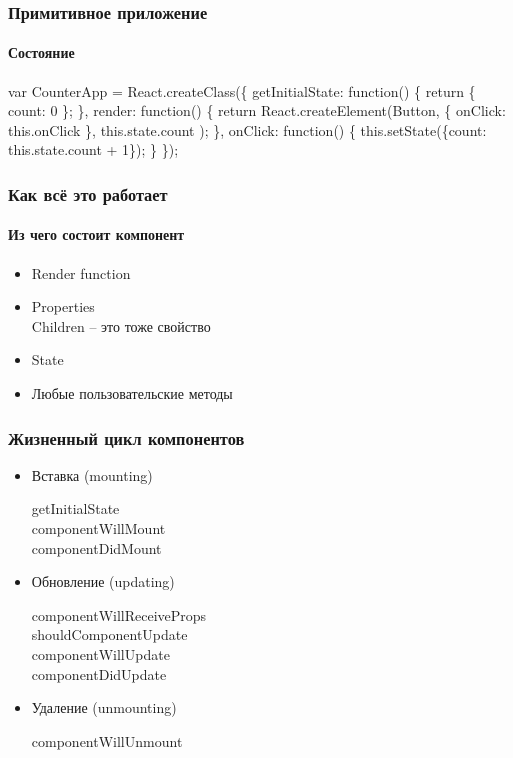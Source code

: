 \documentclass[10pt,utf8]{beamer}
\begin{document}
\begin{frame}[fragile]
  \frametitle{Примитивное приложение}
  \framesubtitle{Состояние}

  \begin{semiverbatim}
    var CounterApp = React.createClass(\{
      getInitialState: function() \{
        return \{ \alert{count: 0} \};
      \},
      render: function() \{
        return React.createElement(Button,
          \{ onClick: this.onClick \},
          \alert{this.state.count}
        );
      \},
      onClick: function() \{
        this.setState(\{\alert{count: this.state.count + 1}\});
      \}
    \});
  \end{semiverbatim}
\end{frame}

\begin{frame}[fragile]
  \frametitle{Как всё это работает}
  \framesubtitle{Из чего состоит компонент}

  \begin{itemize}
  \item
    Render function
    \pause
  \item
    Properties \\
    Children -- это тоже свойство
    \pause
  \item
    State
    \pause
  \item
    Любые пользовательские методы
  \end{itemize}
\end{frame}

\begin{frame}[fragile]
  \frametitle{Жизненный цикл компонентов}

  \begin{itemize}
  \item Вставка (mounting)

    getInitialState \\
    componentWillMount \\
    componentDidMount

    \pause

  \item Обновление (updating)

    componentWillReceiveProps \\
    shouldComponentUpdate \\
    componentWillUpdate \\
    componentDidUpdate

    \pause

  \item Удаление (unmounting)

    componentWillUnmount
  \end{itemize}
\end{frame}
\end{document}

